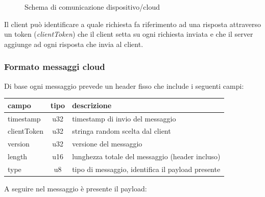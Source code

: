 \documentclass[12pt,a4paper,twoside,titlepage]{book}
\begin{document}
\begin{figure}[ht]
    \centering
    \caption{Schema di comunicazione dispositivo/cloud}
    \label{fig:comunicazione_cloud}
\end{figure}

Il client può identificare a quale richiesta fa riferimento ad una risposta attraverso un
token (\textit{clientToken}) che il client setta su ogni richiesta inviata e che il server aggiunge
ad ogni risposta che invia al client.

\subsubsection{Formato messaggi cloud}

Di base ogni messaggio prevede un header fisso che include i seguenti campi:

\begin{center}
\begin{longtable}{| p{5cm} | c | p{8cm} |}
    \hline
    \textbf{campo} & \textbf{tipo} & \textbf{descrizione} \\
    \hline
    timestamp & u32 & timestamp di invio del messaggio \\
    \hline
    clientToken & u32 & stringa random scelta dal client \\
    \hline
    version & u32 & versione del messaggio \\
    \hline
    length & u16 & lunghezza totale del messaggio (header incluso) \\
    \hline
    type & u8 & tipo di messaggio, identifica il payload presente \\
    \hline
\end{longtable}
\end{center}

A seguire nel messaggio è presente il payload:
\end{document}

